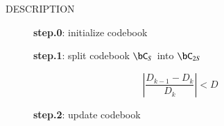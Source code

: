 \begin{qsection}{DESCRIPTION}
\begin{description}
\begin{figure}[tbp]
\begin{minipage}{0.5\hsize}
\begin{center}
\end{center}
\caption{{\bf step.0}: initialize codebook}
\label{fig:lbg_step0}
\end{minipage}
\begin{minipage}{0.5\hsize}
\begin{center}
\end{center}
\caption{{\bf step.1}: split codebook $\bC_{S}$ into $\bC_{2S}$}
\label{fig:lbg_step1}
\end{minipage}
\end{figure}
\begin{displaymath}
\left|\frac{D_{k-1}-D_{k}}{D_{k}}\right| < D
\end{displaymath}
\begin{figure}[tbp]
\begin{minipage}{0.5\hsize}
\begin{center}
\end{center}
\caption{{\bf step.2}: update codebook}
\label{fig:lbg_step2}
\end{minipage}
\end{figure}


\end{description}
\end{qsection}
